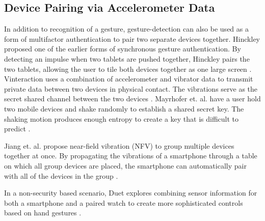 
\subsection{Device Pairing via Accelerometer Data}

In addition to recognition of a gesture, gesture-detection can also be used as a form of multifactor authentication to pair two separate devices together. Hinckley proposed one of the earlier forms of synchronous gesture authentication. By detecting an impulse when two tablets are pushed together, Hinckley pairs the two tablets, allowing the user to tile both devices together as one large screen \cite{SyncGes}. Vinteraction uses a combination of accelerometer and vibrator data to transmit private data between two devices in physical contact. The vibrations serve as the secret shared channel between the two devices \cite{vinteraction}. Mayrhofer et. al. have a user hold two mobile devices and shake randomly to establish a shared secret key. The shaking motion produces enough entropy to create a key that is difficult to predict \cite{ShakeWell}.

Jiang et. al. propose near-field vibration (NFV) to group multiple devices together at once. By propagating the vibrations of a smartphone through a table on which all group devices are placed, the smartphone can automatically pair with all of the devices in the group \cite{Jiang2016}. 

In a non-security based scenario, Duet explores combining sensor information for both a smartphone and a paired watch to create more sophisticated controls based on hand gestures \cite{Duet}.